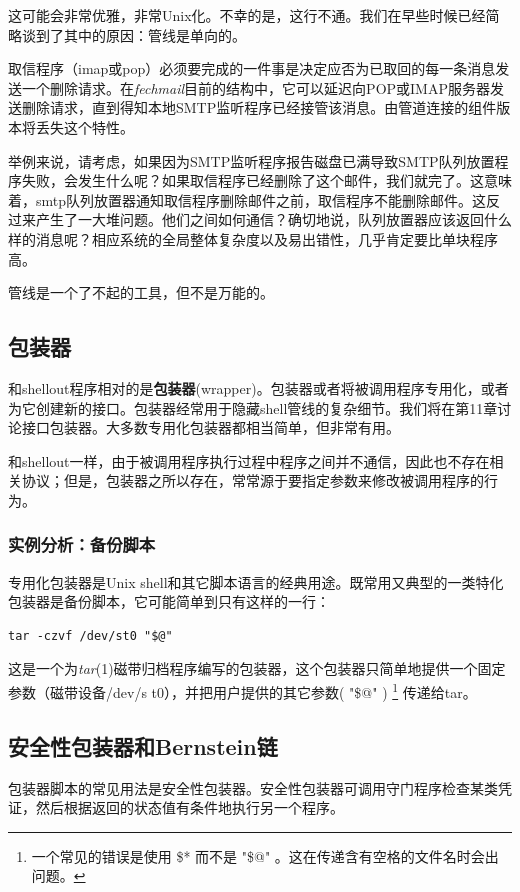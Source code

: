 \documentclass[12pt,oneside]{book}
\begin{document}
这可能会非常优雅，非常Unix化。不幸的是，这行不通。我们在早些时候已经简略谈到了其中的原因：管线是单向的。

取信程序（imap或pop）必须要完成的一件事是决定应否为已取回的每一条消息发送一个删除请求。在\textit{fechmail}目前的结构中，它可以延迟向POP或IMAP服务器发送删除请求，直到得知本地SMTP监听程序已经接管该消息。由管道连接的组件版本将丢失这个特性。

举例来说，请考虑，如果因为SMTP监听程序报告磁盘已满导致SMTP队列放置程序失败，会发生什么呢？如果取信程序已经删除了这个邮件，我们就完了。这意味着，smtp队列放置器通知取信程序删除邮件之前，取信程序不能删除邮件。这反过来产生了一大堆问题。他们之间如何通信？确切地说，队列放置器应该返回什么样的消息呢？相应系统的全局整体复杂度以及易出错性，几乎肯定要比单块程序高。

管线是一个了不起的工具，但不是万能的。


\subsection{包装器}
和shellout程序相对的是\textbf{包装器}(wrapper)。包装器或者将被调用程序专用化，或者为它创建新的接口。包装器经常用于隐藏shell管线的复杂细节。我们将在第11章讨论接口包装器。大多数专用化包装器都相当简单，但非常有用。

和shellout一样，由于被调用程序执行过程中程序之间并不通信，因此也不存在相关协议；但是，包装器之所以存在，常常源于要指定参数来修改被调用程序的行为。


\subsubsection{实例分析：备份脚本}
专用化包装器是Unix shell和其它脚本语言的经典用途。既常用又典型的一类特化包装器是备份脚本，它可能简单到只有这样的一行：
\begin{Verbatim}
tar -czvf /dev/st0 "$@"
\end{Verbatim}


这是一个为\textit{tar}(1)磁带归档程序编写的包装器，这个包装器只简单地提供一个固定参数（磁带设备/dev/s t0），并把用户提供的其它参数(  "\${}@" ) \footnote{一个常见的错误是使用 \${}* 而不是 "\${}@" 。这在传递含有空格的文件名时会出问题。} 传递给tar。


\subsection{安全性包装器和Bernstein链}
包装器脚本的常见用法是安全性包装器。安全性包装器可调用守门程序检查某类凭证，然后根据返回的状态值有条件地执行另一个程序。
\end{document}
